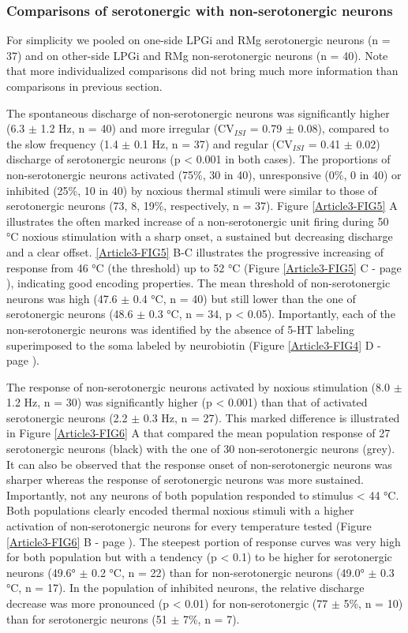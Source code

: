 \documentclass[a4paper,12pt,twoside]{report}
\begin{document}
\subsubsection{Comparisons of serotonergic with non-serotonergic neurons}

For simplicity we pooled on one-side LPGi and RMg serotonergic neurons (n = 37) and on other-side LPGi and RMg non-serotonergic neurons (n = 40). Note that more individualized comparisons did not bring much more information than comparisons in previous section.

The spontaneous discharge of non-serotonergic neurons was significantly higher (6.3 $\pm$ 1.2 Hz, n = 40) and more irregular (CV$_{ISI}$ = 0.79 $\pm$ 0.08), compared to the slow frequency (1.4 $\pm$ 0.1 Hz, n = 37) and regular (CV$_{ISI}$ = 0.41 $\pm$ 0.02) discharge of serotonergic neurons (p < 0.001 in both cases). The proportions of non-serotonergic neurons activated (75\%, 30 in 40), unresponsive (0\%, 0 in 40) or inhibited (25\%, 10 in 40) by noxious thermal stimuli were similar to those of serotonergic neurons (73, 8, 19\%, respectively, n = 37). Figure \ref{Article3-FIG5} A illustrates the often marked increase of a non-serotonergic unit firing during 50 °C noxious stimulation with a sharp onset, a sustained but decreasing discharge and a clear offset. \ref{Article3-FIG5} B-C illustrates the progressive increasing of response from 46 °C (the threshold) up to 52 °C (Figure \ref{Article3-FIG5} C - page \pageref{Article3-FIG5}), indicating good encoding properties. The mean threshold of non-serotonergic neurons was high (47.6 $\pm$ 0.4 °C, n = 40) but still lower than the one of serotonergic neurons (48.6 $\pm$ 0.3 °C, n = 34, p < 0.05). Importantly, each of the non-serotonergic neurons was identified by the absence of 5-HT labeling superimposed to the soma labeled by neurobiotin (Figure \ref{Article3-FIG4} D - page \pageref{Article3-FIG4}). 

The response of non-serotonergic neurons activated by noxious stimulation (8.0 $\pm$ 1.2 Hz, n = 30) was significantly higher (p < 0.001) than that of activated serotonergic neurons (2.2 $\pm$ 0.3 Hz, n = 27). This marked difference is illustrated in Figure \ref{Article3-FIG6} A that compared the mean population response of 27 serotonergic neurons (black) with the one of 30 non-serotonergic neurons (grey). It can also be observed that the response onset of non-serotonergic neurons was sharper whereas the response of serotonergic neurons was more sustained. Importantly, not any neurons of both population responded to stimulus < 44 °C. Both populations clearly encoded thermal noxious stimuli with a higher activation of non-serotonergic neurons for every temperature tested (Figure \ref{Article3-FIG6} B - page \pageref{Article3-FIG6}). The steepest portion of response curves was very high for both population but with a tendency (p < 0.1) to be higher for serotonergic neurons (49.6° $\pm$ 0.2 °C, n = 22) than for non-serotonergic neurons (49.0° $\pm$ 0.3 °C, n = 17).
In the population of inhibited neurons, the relative discharge decrease was more pronounced (p < 0.01) for non-serotonergic (77 $\pm$ 5\%, n = 10) than for serotonergic neurons (51 $\pm$ 7\%, n = 7).
\end{document}
